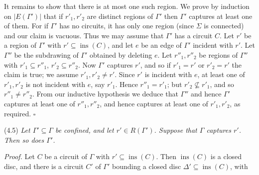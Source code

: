 It remains to show that there is at most one such region. We prove by induction on $|E(\Gamma')|$ that if $r'_1, r'_2$ are distinct regions of $\Gamma'$ then $\Gamma'$ captures at least one of them. For if $\Gamma'$ has no circuits, it has only one region (since $\Sigma$ is connected) and our claim is vacuous. Thus we may assume that $\Gamma'$ has a circuit $C$. Let $r'$ be a region of $\Gamma'$ with $r' \subseteq \operatorname{ins}(C)$, and let $e$ be an edge of $\Gamma'$ incident with $r'$. Let $\Gamma''$ be the subdrawing of $\Gamma'$ obtained by deleting $e$. Let $r''_1, r''_2$ be regions of $\Gamma''$ with $r'_1 \subseteq r''_1$, $r'_2 \subseteq r''_2$. Now $\Gamma'$ captures $r'$, and so if $r'_1 = r'$ or $r'_2 = r'$ the claim is true; we assume $r'_1, r'_2 \ne r'$. Since $r'$ is incident with $e$, at least one of $r'_1, r'_2$ is not incident with $e$, say $r'_1$. Hence $r''_1 = r'_1$; but $r'_2 \not\subseteq r'_1$, and so $r''_1 \ne r''_2$. From our inductive hypothesis we deduce that $\Gamma''$ and hence $\Gamma'$ captures at least one of $r''_1, r''_2$, and hence captures at least one of $r'_1, r'_2$, as required. $\square$

\stmt
(4.5) \textit{Let $\Gamma' \subseteq \Gamma$ be confined, and let $r' \in R(\Gamma')$. Suppose that $\Gamma$ captures $r'$. Then so does $\Gamma'$.}

\textit{Proof.} Let $C$ be a circuit of $\Gamma$ with $r' \subseteq \operatorname{ins}(C)$. Then $\operatorname{ins}(C)$ is a closed disc, and there is a circuit $C'$ of $\Gamma'$ bounding a closed disc $\Delta' \subseteq \operatorname{ins}(C)$, with
